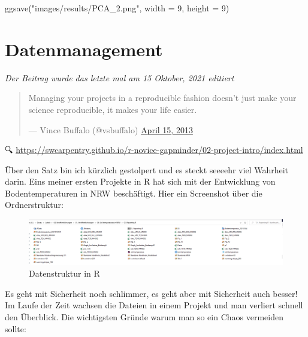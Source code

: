 \documentclass[
]{article}
\newenvironment{Shaded}{\begin{snugshade}}{\end{snugshade}}
\newcommand{\AttributeTok}[1]{\textcolor[rgb]{0.77,0.63,0.00}{#1}}
\newcommand{\DecValTok}[1]{\textcolor[rgb]{0.00,0.00,0.81}{#1}}
\newcommand{\FunctionTok}[1]{\textcolor[rgb]{0.00,0.00,0.00}{#1}}
\newcommand{\NormalTok}[1]{#1}
\newcommand{\StringTok}[1]{\textcolor[rgb]{0.31,0.60,0.02}{#1}}
\begin{document}
\begin{Shaded}
\begin{Highlighting}[]

\FunctionTok{ggsave}\NormalTok{(}\StringTok{"images/results/PCA\_2.png"}\NormalTok{, }\AttributeTok{width =} \DecValTok{9}\NormalTok{, }\AttributeTok{height =} \DecValTok{9}\NormalTok{)}
\end{Highlighting}
\end{Shaded}

\hypertarget{datenmanagement}{%
\section{Datenmanagement}\label{datenmanagement}}

\emph{Der Beitrag wurde das letzte mal am 15 Oktober, 2021 editiert}

\begin{quote}
Managing your projects in a reproducible fashion doesn't just make
your science reproducible, it makes your life easier.

--- Vince Buffalo (@vsbuffalo) \href{https://twitter.com/vsbuffalo/status/323638476153167872}{April 15,
2013}
\end{quote}

🔍 \url{https://swcarpentry.github.io/r-novice-gapminder/02-project-intro/index.html}

Über den Satz bin ich kürzlich gestolpert und es steckt seeeehr viel Wahrheit darin. Eins meiner ersten Projekte in R hat sich mit der Entwicklung von Bodentemperaturen in NRW beschäftigt. Hier ein Screenshot über die Ordnerstruktur:

\begin{figure}

{\centering \includegraphics[width=1\linewidth]{images/049} 

}

\caption{Datenstruktur in R}\label{fig:unnamed-chunk-293}
\end{figure}

Es geht mit Sicherheit noch schlimmer, es geht aber mit Sicherheit auch besser! Im Laufe der Zeit wachsen die Dateien in einem Projekt und man verliert schnell den Überblick. Die wichtigsten Gründe warum man so ein Chaos vermeiden sollte:
\end{document}
